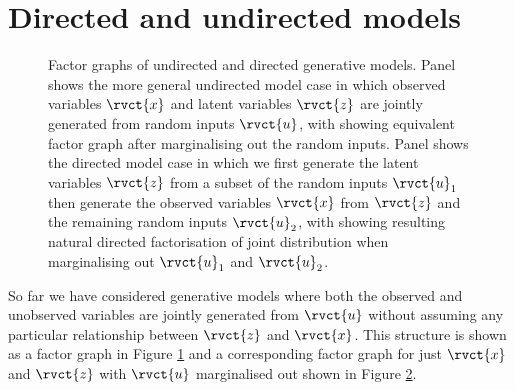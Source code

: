 \section{Directed and undirected models}

\begin{figure}[!t]
\centering
\begin{subfigure}[t]{.3\linewidth}
\centering
{}
\caption{}\label{sfig:undirected-model-factor-graph}
\end{subfigure}%
\begin{subfigure}[t]{.2\linewidth}
\centering
{}
\caption{}\label{sfig:undirected-model-factor-graph-marginalised}
\end{subfigure}%
\begin{subfigure}[t]{.3\linewidth}
\centering
{}
\caption{}\label{sfig:directed-model-factor-graph}
\end{subfigure}%
\begin{subfigure}[t]{.2\linewidth}
\centering
{}
\caption{}\label{sfig:directed-model-factor-graph-marginalised}
\end{subfigure}%
\caption[Undirected and directed generative models.]{Factor graphs of undirected and directed generative models. Panel  shows the more general undirected model case in which observed variables $\rvct{x}$ and latent variables $\rvct{z}$ are jointly generated from random inputs $\rvct{u}$, with  showing equivalent factor graph after marginalising out the random inputs. Panel  shows the directed model case in which we first generate the latent variables $\rvct{z}$ from a subset of the random inputs $\rvct{u}_{1}$ then generate the observed variables $\rvct{x}$ from $\rvct{z}$ and the remaining random inputs $\rvct{u}_{2}$, with  showing resulting natural directed factorisation of joint distribution when marginalising out $\rvct{u}_1$ and $\rvct{u}_2$.}
\label{fig:directed-undirected-model-graphs}
\end{figure}

So far we have considered generative models where both the observed and unobserved variables are jointly generated from $\rvct{u}$ without assuming any particular relationship between $\rvct{z}$ and $\rvct{x}$. This structure is shown as a factor graph in Figure \ref{sfig:undirected-model-factor-graph} and a corresponding factor graph for just $\rvct{x}$ and $\rvct{z}$ with $\rvct{u}$ marginalised out shown in Figure \ref{sfig:undirected-model-factor-graph-marginalised}. 

